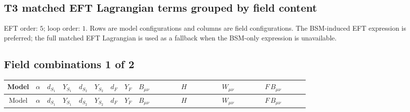 \documentclass[8pt]{article}
\begin{document}
\begin{landscape}
\section*{T3 matched EFT Lagrangian terms grouped by field content}
EFT order: $5$; loop order: $1$. 
Rows are model configurations and columns are field configurations. The BSM-induced EFT expression is preferred; the full matched EFT Lagrangian is used as a fallback when the BSM-only expression is unavailable.
\tiny
\subsection*{Field combinations 1 of 2}
\begin{longtable}{@{}cccccccc >{\raggedright\arraybackslash}p{0.18\linewidth} >{\raggedright\arraybackslash}p{0.18\linewidth} >{\raggedright\arraybackslash}p{0.18\linewidth} >{\raggedright\arraybackslash}p{0.18\linewidth}@{}}
\toprule
Model & $\alpha$ & $d_{S_1}$ & $Y_{S_1}$ & $d_{S_2}$ & $Y_{S_2}$ & $d_F$ & $Y_F$ & $B_{\mu\nu}$ & $H$ & $W_{\mu\nu}$ & $F\,B_{\mu\nu}$ \\
\midrule
\endfirsthead
\toprule
Model & $\alpha$ & $d_{S_1}$ & $Y_{S_1}$ & $d_{S_2}$ & $Y_{S_2}$ & $d_F$ & $Y_F$ & $B_{\mu\nu}$ & $H$ & $W_{\mu\nu}$ & $F\,B_{\mu\nu}$ \\
\midrule
\endhead

\end{longtable}
\end{landscape}
\end{document}
